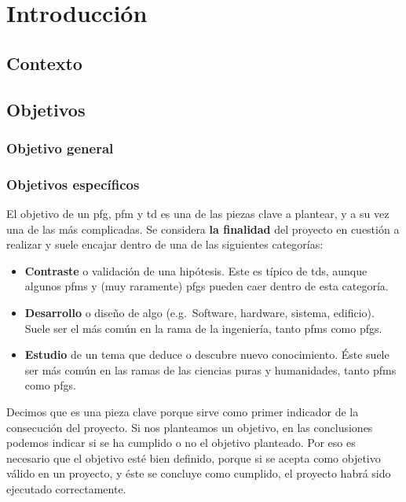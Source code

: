 \chapter{Introducción}
\label{chapter:introduccion}


\section{Contexto}

\section{Objetivos}

\subsection{Objetivo general}

\subsection{Objetivos específicos}


El objetivo de un \gls{pfg}, \gls{pfm} y  \gls{td} es una de las piezas clave a plantear, y a su vez una de las más complicadas. Se considera \textbf{la finalidad} del proyecto en cuestión a realizar y suele encajar dentro de una de las siguientes categorías:

\begin{itemize}
    \item \textbf{Contraste} o validación de una hipótesis. Este es típico de \glspl{td}, aunque algunos \glspl{pfm} y (muy raramente) \glspl{pfg} pueden caer dentro de esta categoría.
    \item \textbf{Desarrollo} o diseño de algo (e.g.~Software, hardware, sistema, edificio). Suele ser el más común en la rama de la ingeniería, tanto \glspl{pfm} como \glspl{pfg}.
    \item \textbf{Estudio} de un tema que deduce o descubre nuevo conocimiento. Éste suele ser más común en las ramas de las ciencias puras y humanidades, tanto \glspl{pfm} como \glspl{pfg}.
\end{itemize}

Decimos que es una pieza clave porque sirve como primer indicador de la consecución del proyecto. Si nos planteamos un objetivo, en las conclusiones podemos indicar si se ha cumplido o no el objetivo planteado. Por eso es necesario que el objetivo esté bien definido, porque si se acepta como objetivo válido en un proyecto, y éste se concluye como cumplido, el proyecto habrá sido ejecutado correctamente.

